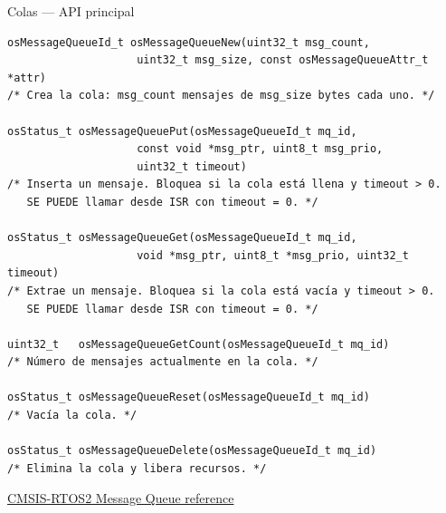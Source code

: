\begin{frame}[fragile]{Colas — API principal}
    \begin{verbatim}
osMessageQueueId_t osMessageQueueNew(uint32_t msg_count,
                    uint32_t msg_size, const osMessageQueueAttr_t *attr)
/* Crea la cola: msg_count mensajes de msg_size bytes cada uno. */

osStatus_t osMessageQueuePut(osMessageQueueId_t mq_id,
                    const void *msg_ptr, uint8_t msg_prio,
                    uint32_t timeout)
/* Inserta un mensaje. Bloquea si la cola está llena y timeout > 0.
   SE PUEDE llamar desde ISR con timeout = 0. */

osStatus_t osMessageQueueGet(osMessageQueueId_t mq_id,
                    void *msg_ptr, uint8_t *msg_prio, uint32_t timeout)
/* Extrae un mensaje. Bloquea si la cola está vacía y timeout > 0.
   SE PUEDE llamar desde ISR con timeout = 0. */

uint32_t   osMessageQueueGetCount(osMessageQueueId_t mq_id)
/* Número de mensajes actualmente en la cola. */

osStatus_t osMessageQueueReset(osMessageQueueId_t mq_id)
/* Vacía la cola. */

osStatus_t osMessageQueueDelete(osMessageQueueId_t mq_id)
/* Elimina la cola y libera recursos. */
    \end{verbatim}
    \vspace{4pt}
    \href{https://arm-software.github.io/CMSIS_5/RTOS2/html/group__CMSIS__RTOS__Message.html}
    {CMSIS-RTOS2 Message Queue reference}
\end{frame}


